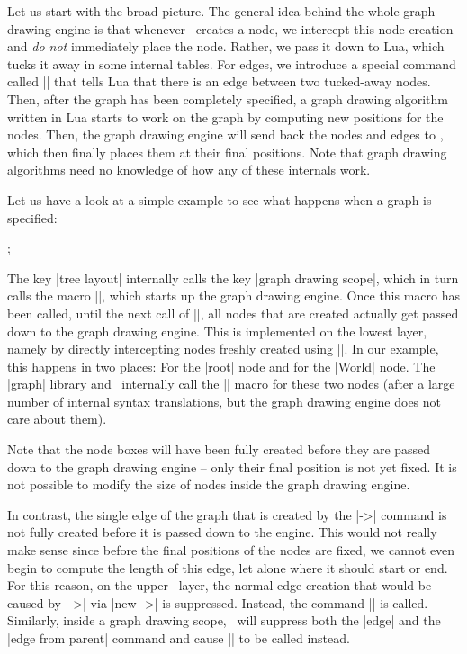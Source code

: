 Let us start with the broad picture. The general idea behind the whole
graph drawing engine is that whenever \pgfname\ creates a node, we
intercept this node creation and \emph{do not} immediately place the
node. Rather, we pass it down to Lua, which tucks it away in
some internal tables. For edges, we introduce a special command called
|\pgfgdedge| that tells Lua that there is an edge between two
tucked-away nodes. Then, after the graph has been completely
specified, a graph drawing algorithm written in Lua starts to work on
the graph by computing new positions for the nodes. Then, the graph
drawing engine will send back the nodes and edges to \pgfname, which
then finally places them at their final positions.
Note that graph drawing algorithms need no knowledge of how any of
these internals work.

Let us have a look at a simple example to see what happens when a
graph is specified:

\begin{codeexample}[]
  ;
\end{codeexample}

The key |tree layout| internally calls the key |graph drawing scope|,
which in turn calls the macro |\pgfgdbeginscope|, which starts up the
graph drawing engine. Once this macro has been 
called, until the next call of |\pgfgdendscope|, all nodes that are
created actually get passed down to the graph drawing engine. This is
implemented on the lowest layer, namely by directly intercepting
nodes freshly created using |\pgfnode|. In our example, this happens
in two places: For the |root| node and for the |World| node. The
|graph| library and \tikzname\ internally call the |\pgfnode| macro
for these two nodes (after a large number of internal syntax
translations, but the graph drawing engine does not care about them).

Note that the node boxes will have been fully created before they are
passed down to the graph drawing engine -- only their final position
is not yet fixed. It is not possible to modify the size of nodes
inside the graph drawing engine. 

In contrast, the single edge of the graph that is created by the |->|
command is not fully created before it is passed down to the
engine. This would not really make sense since before the final
positions of the nodes are fixed, we cannot even begin to compute the
length of this edge, let alone where it should start or end. For this
reason, on the upper \tikzname\ layer, the normal edge creation that
would be caused by |->| via |new ->| is suppressed. Instead, the
command |\pgfgdedge| is called. Similarly, inside a graph drawing
scope, \tikzname\ will suppress both the |edge| and the
|edge from parent| command and cause |\pgfgdedge| to be called
instead. 

